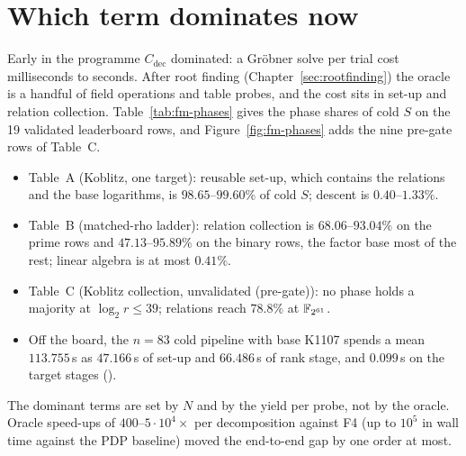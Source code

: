 \section{Which term dominates now}\label{sec:model-dominant}

Early in the programme $C_{\mathrm{dec}}$ dominated: a Gr\"obner solve per
trial cost milliseconds to seconds. After root finding
(Chapter~\ref{sec:rootfinding}) the oracle is a handful of field operations
and table probes, and the cost sits in set-up and relation collection.
Table~\ref{tab:fm-phases} gives the phase shares of cold $S$ on the 19
validated leaderboard rows, and Figure~\ref{fig:fm-phases} adds the nine
pre-gate rows of Table~C.
\begin{itemize}
\item Table~A (Koblitz, one target): reusable set-up, which contains the
  relations and the base logarithms, is $98.65$--$99.60\%$ of cold $S$;
  descent is $0.40$--$1.33\%$.
\item Table~B (matched-rho ladder): relation collection is
  $68.06$--$93.04\%$ on the prime rows and $47.13$--$95.89\%$ on the
  binary rows, the factor base most of the rest; linear algebra is at most
  $0.41\%$.
\item Table~C (Koblitz collection, unvalidated (pre-gate)): no phase holds
  a majority at $\log_2 r\le39$; relations reach $78.8\%$ at $\mathbb{F}_{2^{61}}$.
\item Off the board, the $n=83$ cold pipeline with base K1107 spends a mean
  $113.755$\,s as $47.166$\,s of set-up and $66.486$\,s of rank stage, and
  $0.099$\,s on the target stages
  ().
\end{itemize}
The dominant terms are set by $N$ and by the yield per probe, not by the
oracle. Oracle speed-ups of $400$--$5\cdot10^4\times$ per decomposition
against F4 (up to $10^5$ in wall time against the PDP baseline) moved the
end-to-end gap by one order at most.

\begin{table}[tbp]
\centering\footnotesize\setlength{\tabcolsep}{4pt}

\caption[]{Phase shares (\%) of cold $S$ for the best recipe of each
validated leaderboard row, with $S$ and the ratio to the row's matched rho.
``--'': the row has no such phase (Table~A rows carry relations and linear
algebra inside the reusable set-up; Table~B rows put the target in the
matrix). Each family has its own unit; $S$ compares within a family only.
Shares computed by  from
\texttt{board[*].best.phases\_s} of , copied
to . Standing: validated (19 rows).}
\label{tab:fm-phases}
\end{table}


